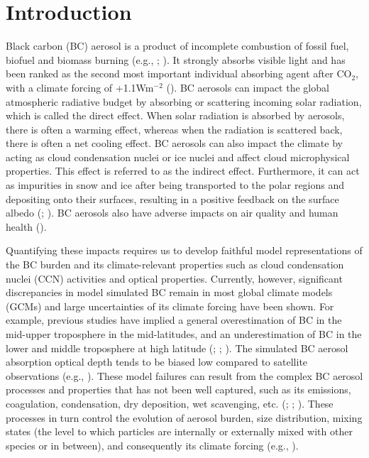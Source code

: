 \documentclass[12pt, fullpage]{uiucthesis2009}
\begin{document}
\chapter{Introduction}
	Black carbon (BC) aerosol is a product of incomplete combustion of fossil fuel, biofuel and biomass burning (e.g., \cite{Bond2004}; \cite{forsstrom2013}). It strongly absorbs visible light and has been ranked as the second most important individual absorbing agent after CO$_{2}$, with a climate forcing of +1.1Wm$^{-2}$ (\cite{Bond2013}). BC aerosols can impact the global atmospheric radiative budget by absorbing or scattering incoming solar radiation, which is called the direct effect. When solar radiation is absorbed by aerosols, there is often a warming effect, whereas when the radiation is scattered back, there is often a net cooling effect. BC aerosols can also impact the climate by acting as cloud condensation nuclei or ice nuclei and affect cloud microphysical properties. This effect is referred to as the indirect effect. Furthermore, it can act as impurities in snow and ice after being transported to the polar regions and depositing onto their surfaces, resulting in a positive feedback on the surface albedo (\cite{zuberi2005hydrophilic}; \cite{flanner2007present}). BC aerosols also have adverse impacts on air quality and human health (\cite{highwood2006smoke}).
	
	Quantifying these impacts requires us to develop faithful model representations of the BC burden and its climate-relevant properties such as cloud condensation nuclei (CCN) activities and optical properties. Currently, however, significant discrepancies in model simulated BC remain in most global climate models (GCMs) and large uncertainties of its climate forcing have been shown. For example, previous studies have implied a general overestimation of BC in the mid-upper troposphere in the mid-latitudes, and an underestimation of BC in the lower and middle troposphere at high latitude (\cite{koch2009evaluation}; \cite{schwarz2010global}; \cite{fan2012easy}). The simulated BC aerosol absorption optical depth tends to be biased low compared to satellite observations (e.g., \cite{koch2009evaluation}). These model failures can result from the complex BC aerosol processes and properties that has not been well captured, such as its emissions, coagulation, condensation, dry deposition, wet scavenging, etc. (\cite{hakami2005adjoint}; \cite{koch2009evaluation}; \cite{shindell2012simultaneously}). These processes in turn control the evolution of aerosol burden, size distribution, mixing states (the level to which particles are internally or externally mixed with other species or in between), and consequently its climate forcing (e.g., \cite{schulz2006radiative}). 
	
\end{document}
